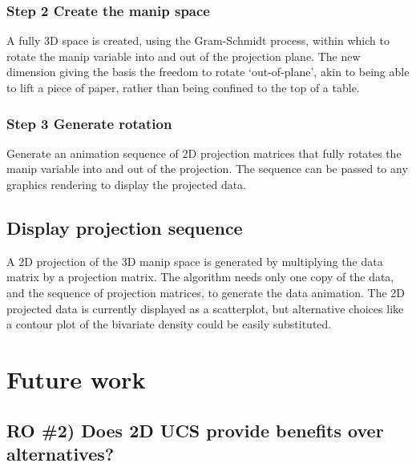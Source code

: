 \documentclass{monashthesis}
\begin{document}
\hypertarget{step-2-create-the-manip-space}{%
\subsection{Step 2 Create the manip space}\label{step-2-create-the-manip-space}}

A fully 3D space is created, using the Gram-Schmidt process, within which to rotate the manip variable into and out of the projection plane. The new dimension giving the basis the freedom to rotate `out-of-plane', akin to being able to lift a piece of paper, rather than being confined to the top of a table.

\hypertarget{step-3-generate-rotation}{%
\subsection{Step 3 Generate rotation}\label{step-3-generate-rotation}}

Generate an animation sequence of 2D projection matrices that fully rotates the manip variable into and out of the projection. The sequence can be passed to any graphics rendering to display the projected data.

\hypertarget{display-projection-sequence}{%
\section{Display projection sequence}\label{display-projection-sequence}}

A 2D projection of the 3D manip space is generated by multiplying the data matrix by a projection matrix. The algorithm needs only one copy of the data, and the sequence of projection matrices, to generate the data animation. The 2D projected data is currently displayed as a scatterplot, but alternative choices like a contour plot of the bivariate density could be easily substituted.

\hypertarget{ch:future_work}{%
\chapter{Future work}\label{ch:future_work}}

\hypertarget{ro-2-does-2d-ucs-provide-benefits-over-alternatives}{%
\section{RO \#2) Does 2D UCS provide benefits over alternatives?}\label{ro-2-does-2d-ucs-provide-benefits-over-alternatives}}
\end{document}
